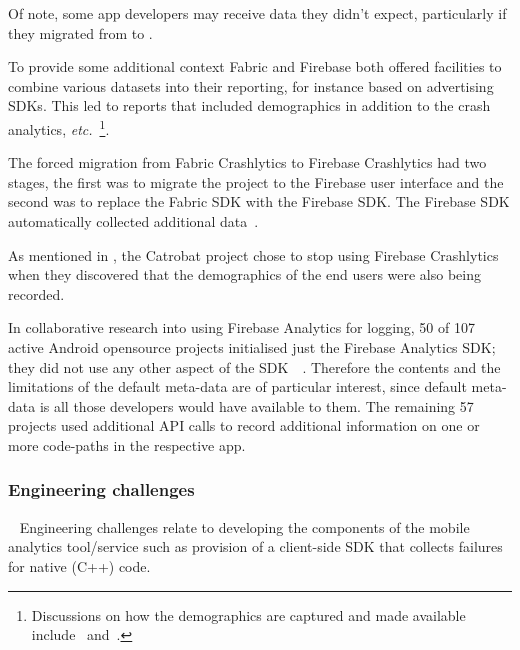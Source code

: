 Of note, some app developers may receive data they didn't expect, particularly if they migrated from  to . 

To provide some additional context Fabric and Firebase both offered facilities to combine various datasets into their reporting, for instance based on advertising SDKs. This led to reports that included demographics in addition to the crash analytics, \emph{etc.}~\footnote{Discussions on how the demographics are captured and made available include~\cite{joe2016_firebase_analytics_demographics} and~\cite{chelo2020_firebase_does_not_collect_age_or_gender_data}.}. 

The forced migration from Fabric Crashlytics to Firebase Crashlytics had two stages, the first was to migrate the project to the Firebase user interface and the second was to replace the Fabric SDK with the Firebase SDK. The Firebase SDK automatically collected additional data~.


As mentioned in , the Catrobat project chose to stop using Firebase Crashlytics when they discovered that the demographics of the end users were also being recorded. 

In collaborative research into using Firebase Analytics for logging, 50 of 107 active Android opensource projects initialised just the Firebase Analytics SDK; they did not use any other aspect of the SDK~~. Therefore the contents and the limitations of the default meta-data are of particular interest, since default meta-data is all those developers would have available to them. The remaining 57 projects used additional API calls to record additional information on one or more code-paths in the respective app.

\subsubsection{Engineering challenges}~\label{section-engineering-challenges}
Engineering challenges relate to developing the components of the mobile analytics tool/service such as provision of a client-side SDK that collects failures for native (C++) code.

